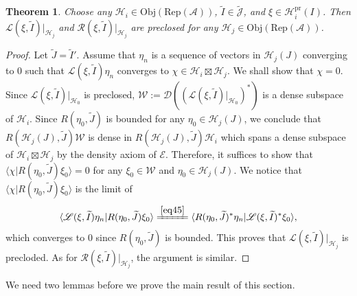 \documentclass[12pt,a4paper]{article}
\theoremstyle{definition}
\theoremstyle{plain}
\newtheorem{thm}[df]{Theorem}
\newcommand{\mc}{\mathcal}
\newcommand{\wtd}{\widetilde}
\newcommand{\Dom}{\scr D}
\newcommand{\bk}[1]{\langle {#1}\rangle}
\newcommand{\scr}{\mathscr}
\newcommand{\Jtd}{\widetilde{\mathcal J}}
\newcommand{\RepA}{\mathrm{Rep}(\mc A)}
\newcommand{\Obj}{\mathrm{Obj}}
\newcommand{\pr}{\mathrm{pr}}
\numberwithin{equation}{section}
\begin{document}
\begin{thm}\label{lb16}
Choose any $\mc H_i\in\Obj(\RepA)$, $\wtd I\in\Jtd$, and $\xi\in\mc H_i^\pr(I)$. Then $\scr L(\xi,\wtd I)|_{\mc H_j}$ and $\scr R(\xi,\wtd I)|_{\mc H_j}$ are preclosed for any $\mc H_j\in\Obj(\RepA)$.
\end{thm}

\begin{proof}
Let $\wtd J=\wtd I'$. Assume that $\eta_n$ is a sequence of vectors in $\mc H_j(J)$ converging to $0$ such that $\scr L(\xi,\wtd I)\eta_n$ converges to $\chi\in\mc H_i\boxtimes\mc H_j$. We shall show that $\chi=0$. Since $\scr L(\xi,\wtd I)|_{\mc H_0}$ is preclosed, $\mc W:=\Dom((\scr L(\xi,\wtd I)|_{\mc H_0})^*)$ is a dense subspace of $\mc H_i$. Since $R(\eta_0,\wtd J)$ is bounded for any $\eta_0\in\mc H_j(J)$, we conclude that $R(\mc H_j(J),\wtd J)\mc W$ is  dense in $R(\mc H_j(J),\wtd J)\mc H_i$ which spans a dense subspace of $\mc H_i\boxtimes\mc H_j$ by the density axiom of $\scr E$. Therefore, it suffices to show that $\bk{\chi|R(\eta_0,\wtd J)\xi_0}=0$ for any $\xi_0\in\mc W$ and $\eta_0\in\mc H_j(J)$. We notice that $\bk{\chi|R(\eta_0,\wtd J)\xi_0}$ is the limit of
\begin{align*}
\bk{\scr L(\xi,\wtd I)\eta_n|R(\eta_0,\wtd J)\xi_0}\xlongequal{\eqref{eq45}} \bk{R(\eta_0,\wtd J)^*\eta_n|\scr L(\xi,\wtd I)^*\xi_0},
\end{align*}
which converges to $0$ since $R(\eta_0,\wtd J)$ is bounded. This proves that $\scr L(\xi,\wtd I)|_{\mc H_j}$ is precloded. As for $\scr R(\xi,\wtd I)|_{\mc H_j}$, the argument is similar.
\end{proof}

We need two lemmas before we prove the main result of this section.
\end{document}

